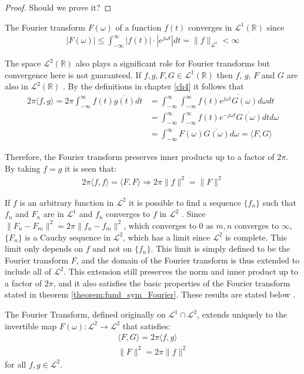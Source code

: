 \begin{proof}
Should we prove it?
\end{proof}

The Fourier transform $F(\omega)$ of a function $f(t)$ converges in $\mathcal{L}^1(\mathbb{R})$ since
\begin{align*}
|F(\omega)| \leq \int_{-\infty}^\infty |f(t)| \cdot |e^{j \omega t}| dt = \|f\|_{\mathcal{L}^1} < \infty
\end{align*}

\noindent
The space $\mathcal{L}^2(\mathbb{R})$ also plays a significant role for Fourier transforms but convergence here is not guaranteed. If $f, g, F, G \in \mathcal{L}^1(\mathbb{R})$ then $f$, $g$, $F$ and $G$ are also in $\mathcal{L}^2(\mathbb{R})$ \cite{page 219, FAA}. By the definitions in chapter \ref{ch4} it follows that
\begin{align*}
2\pi \langle f,g \rangle = 2\pi \int_{-\infty}^\infty f(t) \overline{g(t)} dt &= \int_{-\infty}^\infty \int_{-\infty}^\infty f(t) \overline{e^{j\omega t} G(\omega)} d\omega dt \\
&= \int_{-\infty}^\infty \int_{-\infty}^\infty f(t) e^{-j\omega t} \overline{G(\omega)} dt d\omega \\
&= \int_{-\infty}^\infty F(\omega) \overline{G(\omega)} d\omega = \langle F,G \rangle
\end{align*}

Therefore, the Fourier transform preserves inner products up to a factor of $2\pi$. By taking $f = g$ it is seen that:
\begin{align*}
2\pi \langle f,f \rangle = \langle F,F \rangle \Rightarrow 2\pi \|f\|^2 = \|F\|^2
\end{align*}

If $f$ is an arbitrary function in $\mathcal{L}^2$ it is possible to find a sequence $\{f_n\}$ such that $f_n$ and $F_n$ are in $\mathcal{L}^1$ and $f_n$ converges to $f$ in $\mathcal{L}^2$ \cite{page 82, FAA}. Since $\|F_n - F_m\|^2 = 2\pi\|f_n - f_m\|^2$, which converges to 0 as $m,n$ converges to $\infty$, $\{F_n\}$ is a Cauchy sequence in $\mathcal{L}^2$, which has a limit since $\mathcal{L}^2$ is complete. This limit only depends on $f$ and not on $\{f_n\}$. This limit is simply defined to be the Fourier transform $F$, and the domain of the Fourier transform is thus extended to include all of $\mathcal{L}^2$. This extension still preserves the norm and inner product up to a factor of $2\pi$, and it also satisfies the basic properties of the Fourier transform stated in theorem \ref{theorem:fund_sym_Fourier}. These results are stated below \cite{page 222, FAA}.

\begin{theorem} \label{Plancherel}
The Fourier Transform, defined originally on $\mathcal{L}^1 \cap \mathcal{L}^2$, extends uniquely to the invertible map $F(\omega): \mathcal{L}^2 \to \mathcal{L}^2$ that satisfies:
\begin{align*}
\langle F, G \rangle = 2\pi \langle f,g \rangle \\
\|F\|^2  = 2\pi \|f\|^2
\end{align*}
for all $f,g \in \mathcal{L}^2$.
\end{theorem}